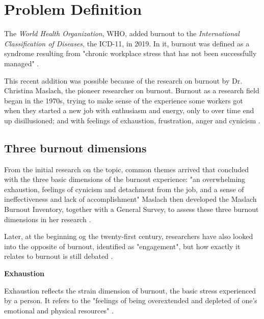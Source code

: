 \chapter{Problem Definition}  

The \textit{World Health Organization}, WHO, added burnout to the \textit{International Classification of Diseases}, the ICD-11, in 2019. In it, burnout was defined as a syndrome resulting from "chronic workplace stress that has not been successfully managed" \parencite{who_notitle_2019}. 

This recent addition was possible because of the research on burnout by Dr. Christina Maslach, the pioneer researcher on burnout. Burnout as a research field began in the 1970s, trying to make sense of the experience some workers got when they started a new job with enthusiasm and energy, only to over time end up disillusioned; and with feelings of exhaustion, frustration, anger and cynicism \parencite[38]{maslach_understanding_2017}.

\section{Three burnout dimensions}

From the initial research on the topic, common themes arrived that concluded with the three basic dimensions of the burnout experience: "an overwhelming exhaustion, feelings of cynicism and detachment from the job, and a sense of ineffectiveness and lack of accomplishment" %
Maslach then developed the Maslach Burnout Inventory, together with a General Survey, to assess these three burnout dimensions in her research \parencite[38]{maslach_understanding_2017}.

Later, at the beginning og the twenty-first century, researchers have also looked into the opposite of burnout, identified as "engagement", but how exactly it relates to burnout is still debated \parencite[40]{maslach_understanding_2017}.

\textbf{Exhaustion}

Exhaustion reflects the strain dimension of burnout, the basic stress experienced by a person. It refers to the "feelings of being overextended and depleted of one’s emotional and physical resources" \parencite[41]{maslach_understanding_2017}. 

